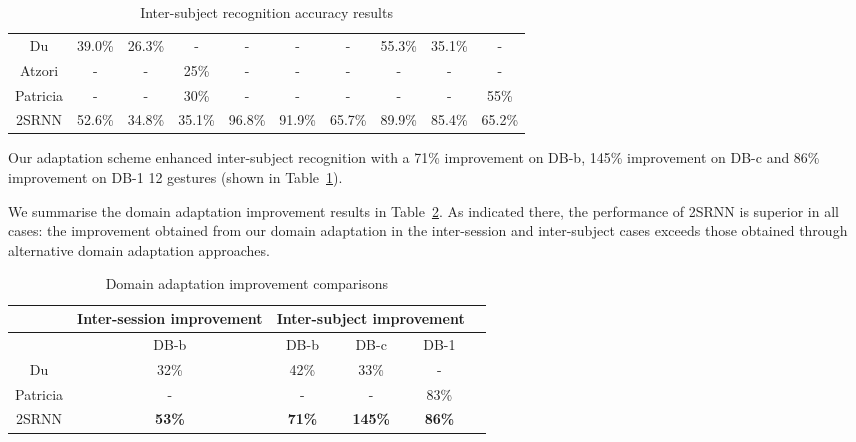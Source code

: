 \documentclass[conference]{IEEEtran}
\begin{document}
{\begin{minipage}{\textwidth}
\begin{table}[tpb]
\begin{threeparttable}
\begin{tabular}{|c|c|c|c|c|c|c|c|c|c|}
			Du\cite{b18} & 39.0\% & 26.3\% & - & - & - & - & 55.3\% & 35.1\% & - \\
			Atzori\cite{b23} & - & - & 25\% & - & - & - & - & - & -\\
			Patricia\cite{b7} & - & - & 30\% & - & - & - & - & - & 55\% \\
			2SRNN & 52.6\% & 34.8\% & 35.1\% & 96.8\% & 91.9\% & 65.7\% & 89.9\% & 85.4\% & 65.2\% \\
			\hline
		\end{tabular}
		\caption{Inter-subject recognition accuracy results}
		\label{table:inter-subject}
	\end{threeparttable}
\end{table}
Our adaptation scheme enhanced inter-subject recognition with a 71\% improvement on DB-b, 145\% improvement on DB-c and 86\% improvement on DB-1 12 gestures (shown in Table~\ref{table:inter-subject}).

We summarise the domain adaptation improvement results in Table~\ref{table:speed-up}. As indicated there, the performance of 2SRNN is superior in all cases: the improvement obtained from our domain adaptation in the inter-session and inter-subject cases exceeds those obtained through alternative domain adaptation approaches.
\begin{table}[tpb]
	\centering
	\begin{threeparttable}
		\setlength{\tabcolsep}{2pt}
		\def\arraystretch{1.5}\begin{tabular}{|c|c|c|c|c|c|} 
			\hline
			& Inter-session improvement & \multicolumn{3}{|c|}{Inter-subject improvement} \\
			\hline
			& DB-b & DB-b & DB-c & DB-1 \\
			Du\cite{b18} & 32\% & 42\% & 33\% & - \\
			Patricia\cite{b7} & - & - & - & 83\% \\
			2SRNN & \textbf{53\%} & \textbf{71\%} & \textbf{145\%} & \textbf{86\%} \\
			\hline
		\end{tabular}
		\caption{Domain adaptation improvement comparisons}
		\label{table:speed-up}
	\end{threeparttable}
\end{table}


\end{minipage}}
\end{document}
